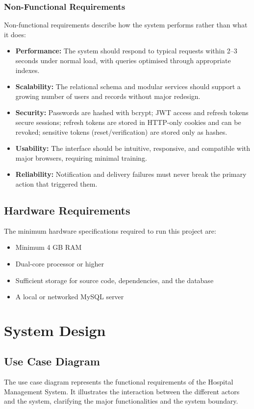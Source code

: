 \documentclass[12pt,a4paper]{report}
\begin{document}
\subsubsection*{Non-Functional Requirements}
Non-functional requirements describe how the system performs rather than what it does:
\begin{itemize}[leftmargin=1.4em]
  \item \textbf{Performance:} The system should respond to typical requests within
        2--3 seconds under normal load, with queries optimised through appropriate
        indexes.
  \item \textbf{Scalability:} The relational schema and modular services should support
        a growing number of users and records without major redesign.
  \item \textbf{Security:} Passwords are hashed with bcrypt; JWT access and refresh
        tokens secure sessions; refresh tokens are stored in HTTP-only cookies and can
        be revoked; sensitive tokens (reset/verification) are stored only as hashes.
  \item \textbf{Usability:} The interface should be intuitive, responsive, and
        compatible with major browsers, requiring minimal training.
  \item \textbf{Reliability:} Notification and delivery failures must never break the
        primary action that triggered them.
\end{itemize}

\subsection{Hardware Requirements}
The minimum hardware specifications required to run this project are:
\begin{itemize}[leftmargin=1.4em, itemsep=1pt]
  \item Minimum 4 GB RAM
  \item Dual-core processor or higher
  \item Sufficient storage for source code, dependencies, and the database
  \item A local or networked MySQL server
\end{itemize}

\section{System Design}

\subsection{Use Case Diagram}
The use case diagram represents the functional requirements of the Hospital Management
System. It illustrates the interaction between the different actors and the system,
clarifying the major functionalities and the system boundary.
\end{document}
